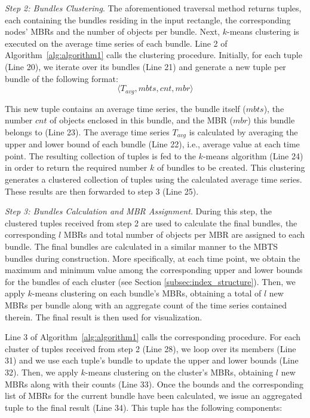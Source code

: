 \emph{Step 2: Bundles Clustering}.
The aforementioned traversal method returns tuples, each containing the bundles residing in the input rectangle, the corresponding nodes' MBRs and the number of objects per bundle. Next, $k$-means clustering is executed on the average time series of each bundle. Line 2 of Algorithm~\ref{alg:algorithm1} calls the clustering procedure. Initially, for each tuple (Line 20), we iterate over its bundles (Line 21) and generate a new tuple per bundle of the following format: 
\begin{equation*}
\langle T_{avg}, mbts, cnt, mbr \rangle
\end{equation*}

\noindent This new tuple contains an average time series, the bundle itself ($mbts$), the number $cnt$ of objects enclosed in this bundle, and the MBR ($mbr$) this bundle belongs to (Line 23). The average time series $T_{avg}$ is calculated by averaging the upper and lower bound of each bundle (Line 22), i.e., average value at each time point. The resulting collection of tuples is fed to the $k$-means algorithm (Line 24) in order to return the required number $k$ of bundles to be created. This clustering generates a clustered collection of tuples using the calculated average time series. These results are then forwarded to step 3 (Line 25).

\emph{Step 3: Bundles Calculation and MBR Assignment}.
During this step, the clustered tuples received from step 2 are used to calculate the final bundles, the corresponding $l$ MBRs and total number of objects per MBR are assigned to each bundle. The final bundles are calculated in a similar manner to the MBTS bundles during \btsr construction. More specifically, at each time point, we obtain the maximum and minimum value among the corresponding upper and lower bounds for the bundles of each cluster (see Section \ref{subsec:index_structure}). Then, we apply $k$-means clustering on each bundle's MBRs, obtaining a total of $l$ new MBRs per bundle along with an aggregate count of the time series contained therein. The final result is then used for visualization.

Line 3 of Algorithm~\ref{alg:algorithm1} calls the corresponding procedure. For each cluster of tuples received from step 2 (Line 28), we loop over its members (Line 31) and we use each tuple's bundle to update the upper and lower bounds (Line 32). Then, we apply $k$-means clustering on the cluster's MBRs, obtaining $l$ new MBRs along with their counts (Line 33). Once the bounds and the corresponding list of MBRs for the current bundle have been calculated, we issue an aggregated tuple to the final result (Line 34). This tuple has the following components:

